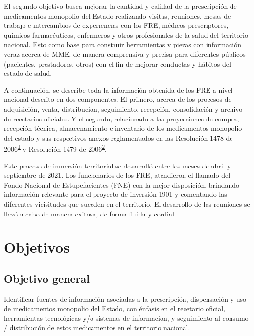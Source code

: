 \documentclass[
  oneside]{book}
\begin{document}
El segundo objetivo busca mejorar la cantidad y calidad de la prescripción de medicamentos monopolio del Estado realizando visitas, reuniones, mesas de trabajo e intercambios de experiencias con los FRE, médicos prescriptores, químicos farmacéuticos, enfermeros y otros profesionales de la salud del territorio nacional. Esto como base para construir herramientas y piezas con información veraz acerca de MME, de manera comprensiva y precisa para diferentes públicos (pacientes, prestadores, otros) con el fin de mejorar conductas y hábitos del estado de salud.

A continuación, se describe toda la información obtenida de los FRE a nivel nacional descrito en dos componentes. El primero, acerca de los procesos de adquisición, venta, distribución, seguimiento, recepción, consolidación y archivo de recetarios oficiales. Y el segundo, relacionado a las proyecciones de compra, recepción técnica, almacenamiento e inventario de los medicamentos monopolio del estado y sus respectivos anexos reglamentados en las Resolución 1478 de 2006\textsuperscript{\protect\hyperlink{ref-MSPS1478-2006}{1}} y Resolución 1479 de 2006\textsuperscript{\protect\hyperlink{ref-MSPS1479-2006}{2}}.

Este proceso de inmersión territorial se desarrolló entre los meses de abril y septiembre de 2021. Los funcionarios de los FRE, atendieron el llamado del Fondo Nacional de Estupefacientes (FNE) con la mejor disposición, brindando información relevante para el proyecto de inversión 1901 y comentando las diferentes vicisitudes que suceden en el territorio. El desarrollo de las reuniones se llevó a cabo de manera exitosa, de forma fluida y cordial.

\hypertarget{objetivos}{%
\chapter{Objetivos}\label{objetivos}}

\hypertarget{objetivo-general}{%
\section{Objetivo general}\label{objetivo-general}}

Identificar fuentes de información asociadas a la prescripción, dispensación y uso de medicamentos monopolio del Estado, con énfasis en el recetario oficial, herramientas tecnológicas y/o sistemas de información, y seguimiento al consumo / distribución de estos medicamentos en el territorio nacional.
\end{document}
